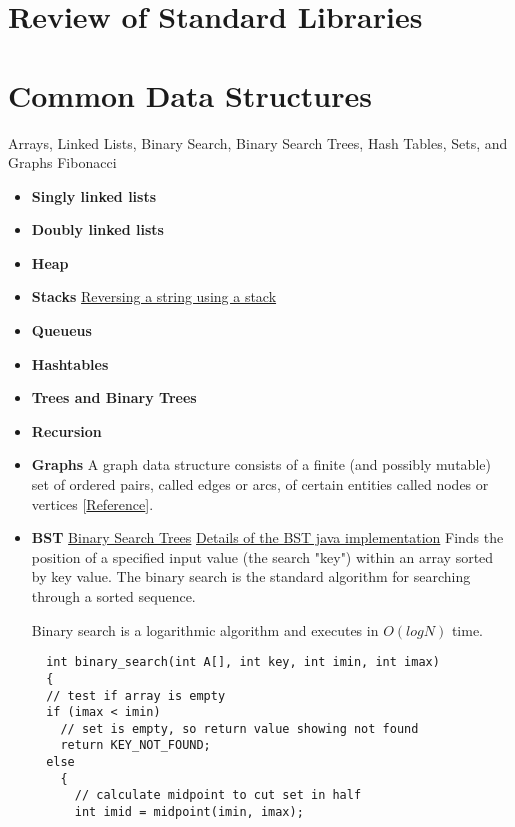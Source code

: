 \documentclass[letterpaper]{article}
\begin{document}
\section{Review of Standard Libraries}

\section{Common Data Structures}
Arrays, Linked Lists, Binary Search, Binary Search Trees, Hash Tables, Sets, and Graphs 
Fibonacci

\begin{itemize}
\item{\bf Singly linked lists}
\item{\bf Doubly linked lists}
\item{\bf Heap}
\item{\bf Stacks}
  \subitem \href{http://www.tutorialspoint.com/javaexamples/data_reverse.htm}{Reversing a string using a stack}
\item{\bf Queueus}
\item{\bf Hashtables}
\item{\bf Trees and Binary Trees}

\item{\bf Recursion}
\item{\bf Graphs} A graph data structure consists of a finite (and possibly mutable) set of ordered pairs, called edges or arcs, of certain entities called nodes or vertices [\href{http://en.wikipedia.org/wiki/Graph_(abstract_data_type)}{Reference}]. 
\item{\bf BST}
  \subitem \href{http://algs4.cs.princeton.edu/32bst/}{Binary Search Trees}
  \subitem \href{http://www.cs.princeton.edu/~rs/AlgsDS07/08BinarySearchTrees.pdf}{Details of 
  the BST java implementation}
  Finds the position of a specified input value (the search "key") within an array sorted 
  by key value.  The binary search is the standard algorithm for searching through a sorted sequence.


\subitem	 Binary search is a logarithmic algorithm and executes in $O(log N)$ time. 
  \begin{lstlisting}
  int binary_search(int A[], int key, int imin, int imax)
  {
  // test if array is empty
  if (imax < imin)
    // set is empty, so return value showing not found
    return KEY_NOT_FOUND;
  else
    {
      // calculate midpoint to cut set in half
      int imid = midpoint(imin, imax);
 

\end{lstlisting}
\end{itemize}
\end{document}
